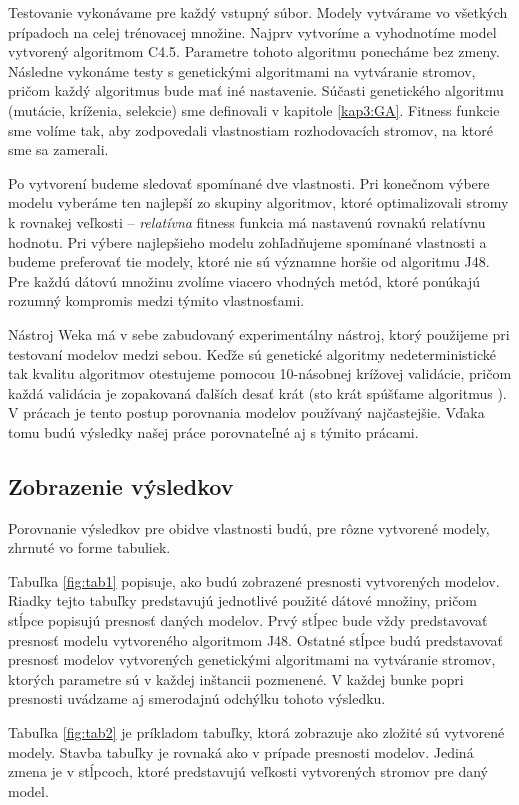 Testovanie vykonávame pre každý vstupný súbor. Modely vytvárame vo všetkých prípadoch na celej trénovacej množine. Najprv vytvoríme a vyhodnotíme model vytvorený algoritmom C4.5. Parametre tohoto algoritmu ponecháme bez zmeny. Následne vykonáme testy s genetickými algoritmami na vytváranie stromov, pričom každý algoritmus bude mať iné nastavenie. Súčasti genetického algoritmu (mutácie, kríženia, selekcie) sme definovali v kapitole \ref{kap3:GA}. Fitness funkcie sme volíme tak, aby zodpovedali vlastnostiam rozhodovacích stromov, na ktoré sme sa zamerali.

Po vytvorení budeme sledovať spomínané dve vlastnosti. Pri konečnom výbere modelu vyberáme ten najlepší zo skupiny algoritmov, ktoré optimalizovali stromy k rovnakej veľkosti -- \emph{relatívna} fitness funkcia má nastavenú rovnakú relatívnu hodnotu. Pri výbere najlepšieho modelu zohľadňujeme spomínané vlastnosti a budeme preferovať tie modely, ktoré nie sú významne horšie od algoritmu J48. Pre každú dátovú množinu zvolíme viacero vhodných metód, ktoré ponúkajú rozumný kompromis medzi týmito vlastnosťami.

Nástroj Weka má v sebe zabudovaný experimentálny nástroj, ktorý použijeme pri testovaní modelov medzi sebou. Keďže sú genetické algoritmy nedeterministické tak kvalitu algoritmov otestujeme pomocou 10-násobnej krížovej validácie, pričom každá validácia je zopakovaná ďalších desať krát (sto krát spúšťame algoritmus ). V prácach je tento postup porovnania modelov používaný najčastejšie. Vďaka tomu budú výsledky našej práce porovnateľné aj s týmito prácami.

\subsection{Zobrazenie výsledkov}
Porovnanie výsledkov pre obidve vlastnosti budú, pre rôzne vytvorené modely, zhrnuté vo forme tabuliek.

Tabuľka \ref{fig:tab1} popisuje, ako budú zobrazené presnosti vytvorených modelov. Riadky tejto tabuľky predstavujú jednotlivé použité dátové množiny, pričom stĺpce popisujú presnosť daných modelov. Prvý stĺpec bude vždy predstavovať presnosť modelu vytvoreného algoritmom J48. Ostatné stĺpce budú predstavovať presnosť modelov vytvorených genetickými algoritmami na vytváranie stromov, ktorých parametre sú v každej inštancii pozmenené. V každej bunke popri presnosti uvádzame  aj smerodajnú odchýlku tohoto výsledku.

Tabuľka \ref{fig:tab2} je príkladom tabuľky, ktorá zobrazuje ako zložité sú vytvorené modely. Stavba tabuľky je rovnaká ako v prípade presnosti modelov. Jediná zmena je v stĺpcoch, ktoré predstavujú veľkosti vytvorených stromov pre daný model.


